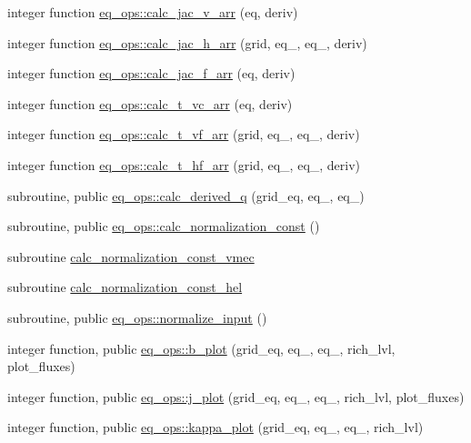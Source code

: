 \begin{DoxyCompactItemize}
integer function \hyperlink{namespaceeq__ops_a1a5caa4fb90d75a3f19aba94f98417e0}{eq\+\_\+ops\+::calc\+\_\+jac\+\_\+v\+\_\+arr} (eq, deriv)
\item 
integer function \hyperlink{namespaceeq__ops_a0b0e2f58fe1133e16ff604499fa24d29}{eq\+\_\+ops\+::calc\+\_\+jac\+\_\+h\+\_\+arr} (grid, eq\+\_, eq\+\_, deriv)
\item 
integer function \hyperlink{namespaceeq__ops_a7d429e0ee6deefac854d3398955dc73d}{eq\+\_\+ops\+::calc\+\_\+jac\+\_\+f\+\_\+arr} (eq, deriv)
\item 
integer function \hyperlink{namespaceeq__ops_acd0be2e627748f6387bb38ee0ad7c906}{eq\+\_\+ops\+::calc\+\_\+t\+\_\+vc\+\_\+arr} (eq, deriv)
\item 
integer function \hyperlink{namespaceeq__ops_a9fe661ac183df2bdf7a96b4450be21aa}{eq\+\_\+ops\+::calc\+\_\+t\+\_\+vf\+\_\+arr} (grid, eq\+\_, eq\+\_, deriv)
\item 
integer function \hyperlink{namespaceeq__ops_a64fe3de828eafa02ef635def9acafaed}{eq\+\_\+ops\+::calc\+\_\+t\+\_\+hf\+\_\+arr} (grid, eq\+\_, eq\+\_, deriv)
\item 
subroutine, public \hyperlink{namespaceeq__ops_a8f774acd7a5af5e9ca315907e3d7a885}{eq\+\_\+ops\+::calc\+\_\+derived\+\_\+q} (grid\+\_\+eq, eq\+\_, eq\+\_)
\item 
subroutine, public \hyperlink{namespaceeq__ops_a09b10d95cd83c89e817664a954f7555d}{eq\+\_\+ops\+::calc\+\_\+normalization\+\_\+const} ()
\item 
subroutine \hyperlink{eq__ops_8f90_a26984870bf6ddccfc7c55bdf5993a4d8}{calc\+\_\+normalization\+\_\+const\+\_\+vmec}
\item 
subroutine \hyperlink{eq__ops_8f90_af011b33f043fd8732eeea7d9f2e03ea3}{calc\+\_\+normalization\+\_\+const\+\_\+hel}
\item 
subroutine, public \hyperlink{namespaceeq__ops_a1b4c764da73624722d7e76498a2b80a9}{eq\+\_\+ops\+::normalize\+\_\+input} ()
\item 
integer function, public \hyperlink{namespaceeq__ops_a9dab060a0bbbbaf6c8ccb66e1f5f160b}{eq\+\_\+ops\+::b\+\_\+plot} (grid\+\_\+eq, eq\+\_, eq\+\_, rich\+\_\+lvl, plot\+\_\+fluxes)
\item 
integer function, public \hyperlink{namespaceeq__ops_af611fc0c83d1ab5ed8940d9a1a652d6c}{eq\+\_\+ops\+::j\+\_\+plot} (grid\+\_\+eq, eq\+\_, eq\+\_, rich\+\_\+lvl, plot\+\_\+fluxes)
\item 
integer function, public \hyperlink{namespaceeq__ops_a9ecb744b3812fe838f13c9886307da24}{eq\+\_\+ops\+::kappa\+\_\+plot} (grid\+\_\+eq, eq\+\_, eq\+\_, rich\+\_\+lvl)

\end{DoxyCompactItemize}

